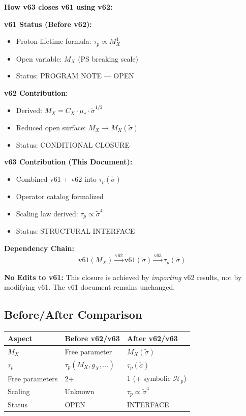 \documentclass[11pt,a4paper]{article}
\theoremstyle{definition}
\begin{document}
\begin{closurebox}
\textbf{How v63 closes v61 using v62:}

\textbf{v61 Status (Before v62):}
\begin{itemize}
  \item Proton lifetime formula: $\tau_p \propto M_X^4$
  \item Open variable: $M_X$ (PS breaking scale)
  \item Status: PROGRAM NOTE --- OPEN
\end{itemize}

\textbf{v62 Contribution:}
\begin{itemize}
  \item Derived: $M_X = C_X \cdot \mu_* \cdot \tilde{\sigma}^{1/2}$
  \item Reduced open surface: $M_X \to M_X(\tilde{\sigma})$
  \item Status: CONDITIONAL CLOSURE
\end{itemize}

\textbf{v63 Contribution (This Document):}
\begin{itemize}
  \item Combined v61 + v62 into $\tau_p(\tilde{\sigma})$
  \item Operator catalog formalized
  \item Scaling law derived: $\tau_p \propto \tilde{\sigma}^4$
  \item Status: STRUCTURAL INTERFACE
\end{itemize}

\textbf{Dependency Chain:}
\begin{equation}
\label{eq:closure-chain}
\text{v61}(M_X) \xrightarrow{\text{v62}} \text{v61}(\tilde{\sigma}) \xrightarrow{\text{v63}} \tau_p(\tilde{\sigma})
\end{equation}

\textbf{No Edits to v61:} This closure is achieved by \emph{importing} v62 results,
not by modifying v61. The v61 document remains unchanged.
\end{closurebox}

\subsection{Before/After Comparison}
\label{subsec:before-after}

\begin{center}
\begin{tabular}{lll}
\toprule
Aspect & Before v62/v63 & After v62/v63 \\
\midrule
$M_X$ & Free parameter & $M_X(\tilde{\sigma})$ \\
$\tau_p$ & $\tau_p(M_X, g_X, \ldots)$ & $\tau_p(\tilde{\sigma})$ \\
Free parameters & 2+ & 1 (+ symbolic $\mathcal{H}_p$) \\
Scaling & Unknown & $\tau_p \propto \tilde{\sigma}^4$ \\
Status & OPEN & INTERFACE \\
\bottomrule
\end{tabular}
\end{center}
\end{document}
